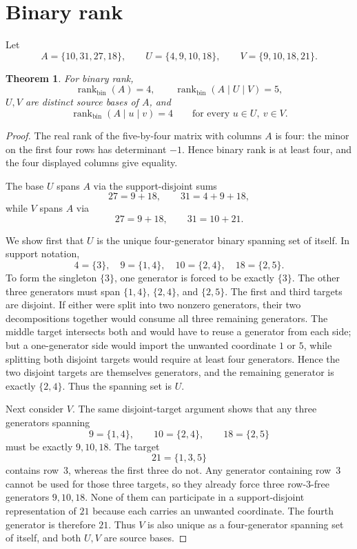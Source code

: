 \documentclass[11pt]{article}
\newtheorem{theorem}{Theorem}
\begin{document}
\section{Binary rank}

Let
\[
A=\{10,31,27,18\},\qquad
U=\{4,9,10,18\},\qquad
V=\{9,10,18,21\}.
\]

\begin{theorem}
For binary rank,
\[
\operatorname{rank}_{\mathrm{bin}}(A)=4,
\qquad
\operatorname{rank}_{\mathrm{bin}}(A\mid U\mid V)=5,
\]
$U,V$ are distinct source bases of $A$, and
\[
\operatorname{rank}_{\mathrm{bin}}(A\mid u\mid v)=4
\qquad\text{for every }u\in U,\ v\in V.
\]
\end{theorem}

\begin{proof}
The real rank of the five-by-four matrix with columns $A$ is four: the minor on the first four rows has determinant $-1$. Hence binary rank is at least four, and the four displayed columns give equality.

The base $U$ spans $A$ via the support-disjoint sums
\[
27=9+18,
\qquad
31=4+9+18,
\]
while $V$ spans $A$ via
\[
27=9+18,
\qquad
31=10+21.
\]

We show first that $U$ is the unique four-generator binary spanning set of itself. In support notation,
\[
4=\{3\},\quad
9=\{1,4\},\quad
10=\{2,4\},\quad
18=\{2,5\}.
\]
To form the singleton $\{3\}$, one generator is forced to be exactly $\{3\}$. The other three generators must span $\{1,4\}$, $\{2,4\}$, and $\{2,5\}$. The first and third targets are disjoint. If either were split into two nonzero generators, their two decompositions together would consume all three remaining generators. The middle target intersects both and would have to reuse a generator from each side; but a one-generator side would import the unwanted coordinate $1$ or $5$, while splitting both disjoint targets would require at least four generators. Hence the two disjoint targets are themselves generators, and the remaining generator is exactly $\{2,4\}$. Thus the spanning set is $U$.

Next consider $V$. The same disjoint-target argument shows that any three generators spanning
\[
9=\{1,4\},\qquad10=\{2,4\},\qquad18=\{2,5\}
\]
must be exactly $9,10,18$. The target
\[
21=\{1,3,5\}
\]
contains row~3, whereas the first three do not. Any generator containing row~3 cannot be used for those three targets, so they already force three row-3-free generators $9,10,18$. None of them can participate in a support-disjoint representation of $21$ because each carries an unwanted coordinate. The fourth generator is therefore $21$. Thus $V$ is also unique as a four-generator spanning set of itself, and both $U,V$ are source bases.


\end{proof}
\end{document}
